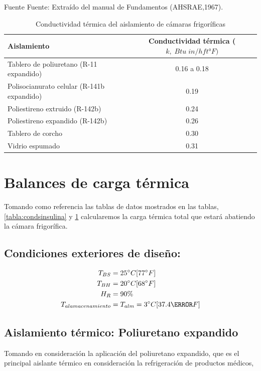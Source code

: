 \begin{table}[H]
	\centering
	\caption{Conductividad térmica del aislamiento de cámaras frigoríficas}Fuente Fuente: Extraído del manual de Fundamentos (AHSRAE,1967).
	\begin{tabular}{lc}
		\hline
		\textbf{Aislamiento} & \textbf{Conductividad térmica ($k,\; Btu\; in/h ft °F)$} \\
		 \hline
		Tablero de poliuretano (R-11 expandido)   & 0.16 a 0.18 \\  
		Polisocianurato celular (R-141b expandido) & 0.19 \\  
		Poliestireno extruido (R-142b)             & 0.24 \\  
		Poliestireno expandido (R-142b)            & 0.26 \\  
		Tablero de corcho                          & 0.30 \\  
		Vidrio espumado                            & 0.31 \\ 
		\hline 
	\end{tabular}
	\label{tabla:aislantes}
\end{table}



\section{Balances de carga térmica}
Tomando como referencia las tablas de datos mostrados en las tablas, \ref{tabla:condsinsulina} y \ref{tabla:aislantes} calcularemos la carga térmica total que estará abatiendo la cámara frigorífica.

\subsection{Condiciones exteriores de diseño:}  
 \begin{equation} 
 \begin{aligned}
 	 T_{BS} &= 25^\circ C [77^\circ F] \\
 	T_{BH} &= 20^\circ C [68^\circ F] \\
 	H_R &= 90\%\\
 	T_{alamacenamiento}& = T_{alm} = 3^\circ C [37.4\degree F]
 	 \end{aligned} 		 
 \end{equation}
 
	
 \subsection{Aislamiento térmico: Poliuretano expandido}
	Tomando en consideración la aplicación del poliuretano expandido, que es el principal aislante térmico en consideración la refrigeración de productos médicos, 
	
